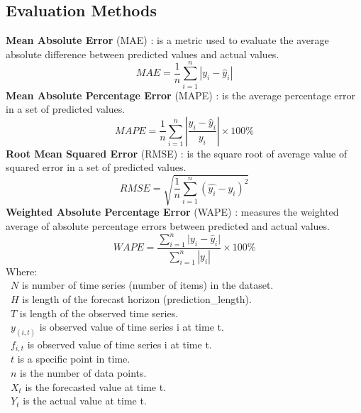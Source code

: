 \documentclass{ieeeojies}
\begin{document}
\subsection{Evaluation Methods}
\textbf{Mean Absolute Error} (MAE) \cite{b11}: is a metric used to evaluate the average absolute difference between predicted values and actual values.\\
    \[MAE = \frac{1}{n} \sum_{i=1}^{n} |y_i - \hat{y}_i|\]
\textbf{Mean Absolute Percentage Error} (MAPE) \cite{b11}: is the average percentage error in a set of predicted values.\\
    \[MAPE=\frac{1}{n}  \sum_{i=1}^{n} |\frac{y_i - \hat{y}_i}{y_i}| \times 100\% \]
\textbf{Root Mean Squared Error} (RMSE) \cite{b11}: is the square root of average value of squared error in a set of predicted values.\\
    \[RMSE= \sqrt{\frac{1}{n} \sum_{i=1}^{n} (\hat{y_i}-y_i )^2} \]
\textbf{Weighted Absolute Percentage Error} (WAPE) \cite{b11}: measures the weighted average of absolute percentage errors between predicted and actual values.\\
    \[WAPE = \frac{{\sum_{i=1}^{n}} {|y_i - \hat{y}_i}|}{\sum_{i=1}^{n} |y_i|} \times 100\%\]
Where: \\
    \indent\ \(N\) is number of time series (number of items) in the dataset.\\
    \indent\ \(H\) is length of the forecast horizon (prediction\_length).\\
    \indent\ \(T\) is length of the observed time series.\\
    \indent\ \(y_(i,t)\) is observed value of time series i at time t.\\
    \indent\ \(f_{i,t}\) is observed value of time series i at time t.\\
    \indent\ \(t\) is a specific point in time.\\
    \indent\ \(n\) is the number of data points.\\
    \indent\ \(X_t\) is the forecasted value at time t.\\
    \indent\ \(Y_t\) is the actual value at time t.\\
\end{document}

